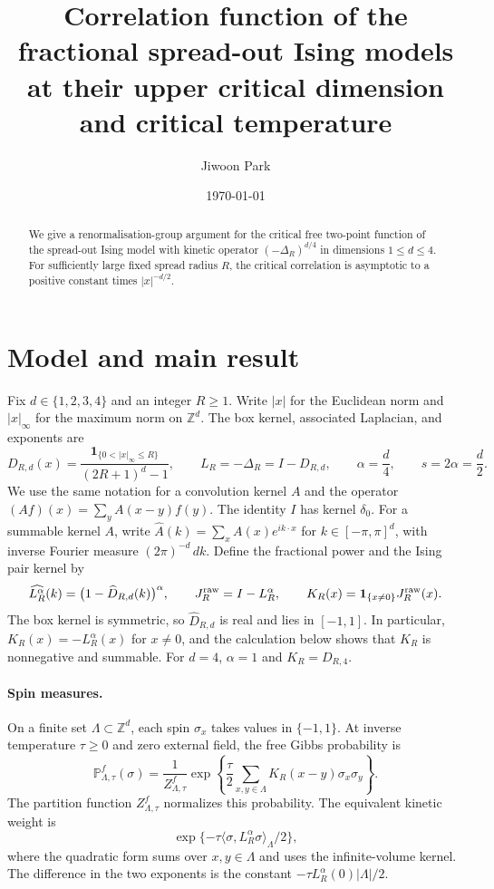 \documentclass[11pt]{article}
\title{Correlation function of the fractional spread-out Ising models at their upper critical dimension and critical temperature}
\author{Jiwoon Park}
\date{\today}
\newcommand{\Z}{\mathbb Z}
\begin{document}
\maketitle

\begin{abstract}
We give a renormalisation-group argument for the critical free two-point
function of the spread-out Ising model with kinetic operator
\((-\Delta_R)^{d/4}\) in dimensions \(1\le d\le4\). For sufficiently
large fixed spread radius \(R\), the critical correlation is asymptotic
to a positive constant times \(|x|^{-d/2}\).
\end{abstract}

\section{Model and main result}
\label{sec:model}\label{frac:operator}

Fix \(d\in\{1,2,3,4\}\) and an integer \(R\ge1\). Write \(|x|\)
for the Euclidean norm and \(|x|_\infty\) for the maximum norm on
\(\Z^d\). The box kernel, associated Laplacian, and exponents are
\[
 D_{R,d}(x)=\frac{\boldsymbol1_{\{0<|x|_\infty\le R\}}}
                   {(2R+1)^d-1},
 \qquad L_R=-\Delta_R=I-D_{R,d},
 \qquad \alpha=\frac d4,\qquad s=2\alpha=\frac d2.
\]
We use the same notation for a convolution kernel \(A\) and the operator
\((Af)(x)=\sum_y A(x-y)f(y)\). The identity \(I\) has kernel \(\delta_0\).
For a summable kernel \(A\), write
\(\widehat A(k)=\sum_x A(x)e^{ik\cdot x}\) for \(k\in[-\pi,\pi]^d\),
with inverse Fourier measure \((2\pi)^{-d}\,dk\). Define the
fractional power and the Ising pair kernel by
\[
 \widehat{L_R^\alpha}(k)=\bigl(1-\widehat D_{R,d}(k)\bigr)^\alpha,
 \qquad J_R^{\rm raw}=I-L_R^\alpha,
 \qquad K_R(x)=\boldsymbol1_{\{x\ne0\}}J_R^{\rm raw}(x).
\]
The box kernel is symmetric, so \(\widehat D_{R,d}\) is real and lies
in \([-1,1]\). In particular, \(K_R(x)=-L_R^\alpha(x)\) for \(x\ne0\), and the
calculation below shows that \(K_R\) is nonnegative and summable.
For \(d=4\), \(\alpha=1\) and \(K_R=D_{R,4}\).

\paragraph{Spin measures.}
On a finite set \(\Lambda\subset\Z^d\), each spin
\(\sigma_x\) takes values in \(\{-1,1\}\). At inverse temperature
\(\tau\ge0\) and zero external field, the free Gibbs probability is
\begin{equation}\label{frac:weight}
 \mathbb P^f_{\Lambda,\tau}(\sigma)
 =\frac{1}{Z^f_{\Lambda,\tau}}
    \exp\!\left\{\frac\tau2
      \sum_{x,y\in\Lambda}K_R(x-y)\sigma_x\sigma_y\right\}.
\end{equation}
The partition function \(Z^f_{\Lambda,\tau}\) normalizes this probability.
The equivalent kinetic weight is
\[
 \exp\{-\tau\langle\sigma,L_R^\alpha\sigma\rangle_\Lambda/2\},
\]
where the quadratic form sums over \(x,y\in\Lambda\) and uses the
infinite-volume kernel. The difference in the two exponents is the
constant \(-\tau L_R^\alpha(0)|\Lambda|/2\).
\end{document}
